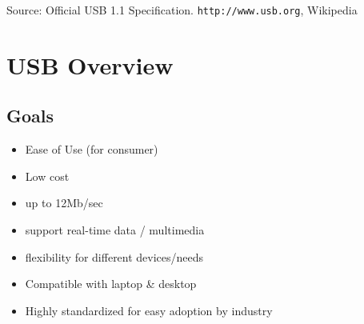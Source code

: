 %
%
%
%
%
%
%
%
%
%
%
%
%
%
%
%
Source:  Official USB 1.1 Specification. 
{\tt http://www.usb.org}, Wikipedia 


\section{USB Overview}
\subsection{Goals}
\begin{itemize}
        \item Ease of Use (for consumer)
        \item Low cost
        \item up to 12Mb/sec
        \item support real-time data / multimedia
        \item flexibility for different devices/needs
        \item Compatible with laptop \& desktop
        \item Highly standardized for easy adoption
        by industry
\end{itemize}

